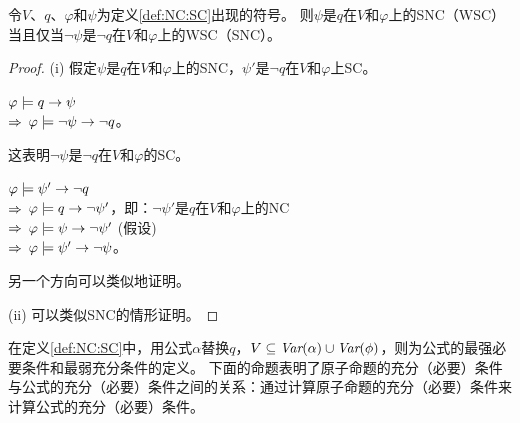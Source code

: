 \begin{proposition}[对偶性]\label{dual}
	令$V$、$q$、$\varphi$和$\psi$为定义\ref{def:NC:SC}出现的符号。
	则$\psi$是$q$在$V$和$\varphi$上的SNC（WSC）当且仅当$\neg \psi$是$\neg q$在$V$和$\varphi$上的WSC（SNC）。
\end{proposition}
\begin{proof}
	(i) 假定$\psi$是$q$在$V$和$\varphi$上的SNC，$\psi'$是$\neg q$在$V$和$\varphi$上SC。
	
	$\varphi \models q \rightarrow \psi$ \\
	$\Rightarrow$ $\varphi \models \neg \psi \rightarrow \neg q$。
	
	这表明$\neg \psi$是$\neg q$在$V$和$\varphi$的SC。
	
	$\varphi \models \psi' \rightarrow \neg q$\\
	$\Rightarrow$ $\varphi \models q \rightarrow \neg \psi'$，即：$\neg \psi'$是$q$在$V$和$\varphi$上的NC\\
	$\Rightarrow$ $\varphi \models \psi \rightarrow \neg \psi'$ \hfill (假设)\\
	$\Rightarrow$ $\varphi \models \psi' \rightarrow \neg \psi$。
	
	另一个方向可以类似地证明。
	
	(ii) 可以类似SNC的情形证明。
\end{proof}


在定义\ref{def:NC:SC}中，用公式$\alpha$替换$q$，$V\subseteq \textit{Var}(\alpha) \cup \textit{Var}(\phi)$，则为公式的最强必要条件和最弱充分条件的定义。
下面的命题表明了原子命题的充分（必要）条件与公式的充分（必要）条件之间的关系：通过计算原子命题的充分（必要）条件来计算公式的充分（必要）条件。



